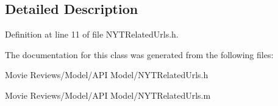 \subsection{Detailed Description}


Definition at line 11 of file N\+Y\+T\+Related\+Urls.\+h.



The documentation for this class was generated from the following files\+:\begin{DoxyCompactItemize}
\item 
Movie Reviews/\+Model/\+A\+P\+I Model/N\+Y\+T\+Related\+Urls.\+h\item 
Movie Reviews/\+Model/\+A\+P\+I Model/N\+Y\+T\+Related\+Urls.\+m\end{DoxyCompactItemize}

